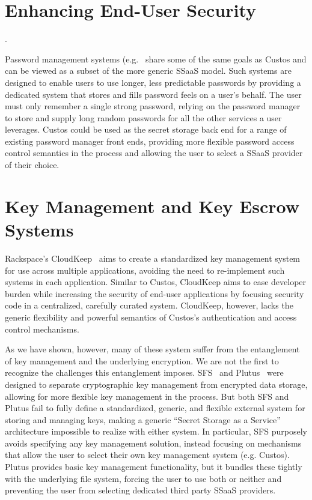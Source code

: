 \section{Enhancing End-User Security}
\cite{openpgp, pgp, gnupg}
\cite{enigmail, mailpile, koch2011}
\cite{lastpass, onepassword, apple-icloud}
\cite{schneier-passwords, krebs-passwords, brodkin-passman}.
\cite{spideroak}

Password management systems (e.g.~\cite{lastpass} share some of the
same goals as Custos and can be viewed as a subset of the more generic
SSaaS model. Such systems are designed to enable users to use longer,
less predictable passwords by providing a dedicated system that stores
and fills password feels on a user's behalf. The user must only
remember a single strong password, relying on the password manager to
store and supply long random passwords for all the other services a
user leverages. Custos could be used as the secret storage back end
for a range of existing password manager front ends, providing more
flexible password access control semantics in the process and allowing
the user to select a SSaaS provider of their choice.

\section{Key Management and Key Escrow Systems}
\cite{blaze1996, denning1996}
\cite{cloudkeep-presentation, cloudkeep}
\cite{gazzang, porticor, rosen2012}
\cite{amazon-hsm}

Rackspace's CloudKeep~\cite{cloudkeep} aims to create a standardized
key management system for use across multiple applications, avoiding
the need to re-implement such systems in each application. Similar to
Custos, CloudKeep aims to ease developer burden while increasing the
security of end-user applications by focusing security code in a
centralized, carefully curated system. CloudKeep, however, lacks the
generic flexibility and powerful semantics of Custos's authentication
and access control mechanisms.

As we have shown, however, many
of these system suffer from the entanglement of key management and the
underlying encryption. We are not the first to recognize the
challenges this entanglement imposes. SFS~\cite{mazieres1999} and
Plutus~\cite{kallahalla2003} were designed to separate cryptographic
key management from encrypted data storage, allowing for more flexible
key management in the process. But both SFS and Plutus fail to fully
define a standardized, generic, and flexible external system for
storing and managing keys, making a generic ``Secret Storage as a
Service'' architecture impossible to realize with either system. In
particular, SFS purposely avoids specifying any key management
solution, instead focusing on mechanisms that allow the user to select
their own key management system (e.g. Custos). Plutus provides basic
key management functionality, but it bundles these tightly with the
underlying file system, forcing the user to use both or neither and
preventing the user from selecting dedicated third party SSaaS
providers.


